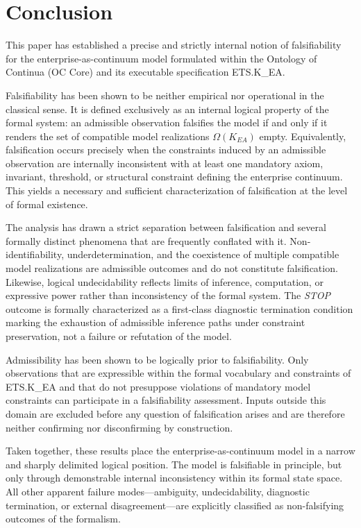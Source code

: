 ﻿\section{Conclusion}

This paper has established a precise and strictly internal notion of
falsifiability for the enterprise-as-continuum model formulated within the
Ontology of Continua (OC Core) and its executable specification
ETS.K\_EA.

\medskip

Falsifiability has been shown to be neither empirical nor operational in the
classical sense.
It is defined exclusively as an internal logical property of the formal
system: an admissible observation falsifies the model if and only if it
renders the set of compatible model realizations
\(\Omega(K_{EA})\) empty.
Equivalently, falsification occurs precisely when the constraints induced by
an admissible observation are internally inconsistent with at least one
mandatory axiom, invariant, threshold, or structural constraint defining
the enterprise continuum.
This yields a necessary and sufficient characterization of falsification at
the level of formal existence.

\medskip

The analysis has drawn a strict separation between falsification and several
formally distinct phenomena that are frequently conflated with it.
Non-identifiability, underdetermination, and the coexistence of multiple
compatible model realizations are admissible outcomes and do not constitute
falsification.
Likewise, logical undecidability reflects limits of inference, computation,
or expressive power rather than inconsistency of the formal system.
The \emph{STOP} outcome is formally characterized as a first-class
diagnostic termination condition marking the exhaustion of admissible
inference paths under constraint preservation, not a failure or refutation
of the model.

\medskip

Admissibility has been shown to be logically prior to falsifiability.
Only observations that are expressible within the formal vocabulary and
constraints of ETS.K\_EA and that do not presuppose violations of mandatory
model constraints can participate in a falsifiability assessment.
Inputs outside this domain are excluded before any question of
falsification arises and are therefore neither confirming nor disconfirming
by construction.

\medskip

Taken together, these results place the enterprise-as-continuum model in a
narrow and sharply delimited logical position.
The model is falsifiable in principle, but only through demonstrable
internal inconsistency within its formal state space.
All other apparent failure modes—ambiguity, undecidability, diagnostic
termination, or external disagreement—are explicitly classified as
non-falsifying outcomes of the formalism.

